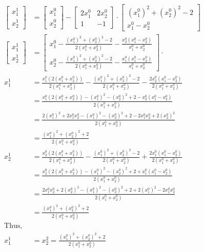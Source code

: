 \documentclass{article}
\begin{document}
\begin{align*}
    \begin{bmatrix} x_1^1 \\[1ex] x_2^1\end{bmatrix} &= \begin{bmatrix} x_1^0 \\[1ex] x_2^0\end{bmatrix} - \begin{bmatrix} 2x_1^0 & 2x_2^0 \\[1ex] 1 & -1\end{bmatrix} \cdot \begin{bmatrix} (x_1^0)^2+(x_2^0)^2 -2 \\[1ex] x_1^0 - x_2^0 \end{bmatrix} \\
    \begin{bmatrix} x_1^1 \\[1ex] x_2^1\end{bmatrix} &=  \begin{bmatrix} x_1^0- \frac{(x_1^0)^2 + (x_2^0)^2 -2}{2(x_1^0+x_2^0)} - \frac{x_2^0 (x_1^0 - x_2^0)}{x_1^0 + x_2^0} \\[1ex] x_2^0 - \frac{(x_1^0)^2 + (x_2^0)^2 -2}{2(x_1^0+x_2^0)} - \frac{x_1^0 (x_1^0 - x_2^0)}{x_1^0 + x_2^0} \end{bmatrix} \cdot  \\
    x_1^1 &=  \frac{x_1^0(2(x_1^0 + x_2^0))}{2(x_1^0+x_2^0)} - \frac{(x_1^0)^2 + (x_2^0)^2 - 2 }{2(x_1^0+x_2^0)} - \frac{2x_2^0(x_1^0 - x_2^0)}{2(x_1^0+x_2^0)} \\
    &= \frac{x_1^0(2(x_1^0 + x_2^0))-(x_1^0)^2 - (x_2^0)^2 + 2 - x_2^0(x_1^0 - x_2^0)}{2(x_1^0+x_2^0)}\\
    &=  \frac{2(x_1^0)^2 + 2x_1^0x_2^0 - (x_1^0)^2 - (x_2^0)^2 +2 - 2x_1^0x_2^0 + 2(x_2^0)^2}{2(x_1^0+x_2^0)}\\
    &=  \frac{(x_1^0)^2 + (x_2^0)^2 + 2 }{2(x_1^0+x_2^0)}\\
    x_2^1 &=  \frac{x_2^0(2(x_1^0 + x_2^0))}{2(x_1^0+x_2^0)} - \frac{(x_1^0)^2 + (x_2^0)^2 - 2 }{2(x_1^0+x_2^0)} + \frac{2x_1^0(x_1^0 - x_2^0)}{2(x_1^0+x_2^0)} \\
    &= \frac{x_2^0(2(x_1^0 + x_2^0))-(x_1^0)^2 - (x_2^0)^2 + 2 + x_1^0(x_1^0 - x_2^0)}{2(x_1^0+x_2^0)}\\
    &= \frac{2x_1^0x_2^0 + 2(x_2^0)^2 - (x_1^0)^2 - (x_2^0)^2 + 2 + 2(x_1^0)^2 - 2x_1^0x_2^0}{2(x_1^0+x_2^0)}\\
    &= \frac{(x_1^0)^2 + (x_2^0)^2 +2}{2(x_1^0 + x_2^0)}\\
    \text{Thus,}&\\
    x_1^1 &= x_2^2 =  \frac{(x_1^0)^2 + (x_2^0)^2 +2}{2(x_1^0 + x_2^0)}\\
\end{align*}
\end{document}
